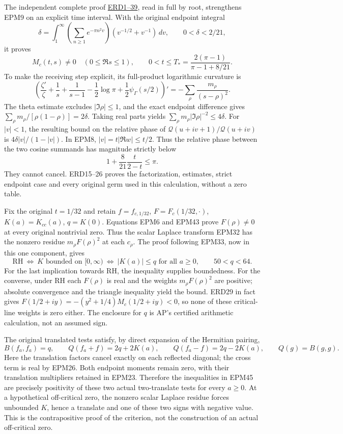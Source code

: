 \documentclass[
  10pt,
  a4paper,
]{article}
\begin{document}
The independent complete proof
\href{ENDPOINT_RESONANT_ZERO_DETECTION.md}{ERD1--39}, read in full by
root, strengthens EPM9 on an explicit time interval. With the original
endpoint integral \[
\delta=\int_1^\infty\left(\sum_{n\ge1}e^{-\pi n^2v}\right)
(v^{-1/2}+v^{-1})\,dv,\qquad 0<\delta<2/21,
\] it proves \[
M_c(t,s)\ne0\quad(0\le\Re s\le1),\qquad
0<t\le T_*=\frac{2(\pi-1)}{\pi-1+8/21}.
\tag{EPM43}
\] To make the receiving step explicit, its full-product logarithmic
curvature is \[
\left(\frac{\zeta'}{\zeta}+\frac1s+\frac1{s-1}
-\frac12\log\pi+\frac12\psi_\Gamma(s/2)\right)'
=-\sum_\rho\frac{m_\rho}{(s-\rho)^2}.
\] The theta estimate excludes \(|\Im\rho|\le1\), and the exact endpoint
difference gives \(\sum_\rho m_\rho/[\rho(1-\rho)]=2\delta\). Taking
real parts yields \(\sum_\rho m_\rho|\Im\rho|^{-2}\le4\delta\). For
\(|v|<1\), the resulting bound on the relative phase of
\(\mathcal Q(u+iv+1)/\mathcal Q(u+iv)\) is \(4\delta|v|/(1-|v|)\). In
EPM8, \(|v|=t|\Re w|\le t/2\). Thus the relative phase between the two
cosine summands has magnitude strictly below \[
1+\frac8{21}\frac{t}{2-t}\le\pi.
\tag{EPM44}
\] They cannot cancel. ERD15--26 proves the factorization, estimates,
strict endpoint case and every original germ used in this calculation,
without a zero table.

Fix the original \(t=1/32\) and retain \(f=f_{c,1/32}\),
\(F=F_c(1/32,\cdot)\), \(K(a)=K_{cc}(a)\), \(q=K(0)\). Equations EPM6
and EPM43 prove \(F(\rho)\ne0\) at every original nontrivial zero. Thus
the scalar Laplace transform EPM32 has the nonzero residue
\(m_\rho F(\rho)^2\) at each \(c_\rho\). The proof following EPM33, now
in this one component, gives \[
\boxed{\mathrm{RH}\ \Longleftrightarrow\
K\text{ bounded on }[0,\infty)\
\Longleftrightarrow\ |K(a)|\le q\text{ for all }a\ge0,
\qquad 50<q<64.}
\tag{EPM45}
\] For the last implication towards RH, the inequality supplies
boundedness. For the converse, under RH each \(F(\rho)\) is real and the
weights \(m_\rho F(\rho)^2\) are positive; absolute convergence and the
triangle inequality yield the bound. ERD29 in fact gives
\(F(1/2+iy)=-(y^2+1/4)M_c(1/2+iy)<0\), so none of these critical-line
weights is zero either. The enclosure for \(q\) is AP's certified
arithmetic calculation, not an assumed sign.

The original translated tests satisfy, by direct expansion of the
Hermitian pairing, \[
B(f_a,f_a)=q,\qquad
Q(f_a+f)=2q+2K(a),\qquad
Q(f_a-f)=2q-2K(a),\qquad Q(g)=B(g,g).
\tag{EPM46}
\] Here the translation factors cancel exactly on each reflected
diagonal; the cross term is real by EPM26. Both endpoint moments remain
zero, with their translation multipliers retained in EPM23. Therefore
the inequalities in EPM45 are precisely positivity of these two actual
two-translate tests for every \(a\ge0\). At a hypothetical off-critical
zero, the nonzero scalar Laplace residue forces unbounded \(K\), hence a
translate and one of these two signs with negative value. This is the
contrapositive proof of the criterion, not the construction of an actual
off-critical zero.
\end{document}
